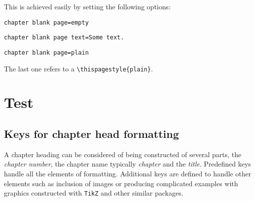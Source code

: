 \begin{teXXX}
\makeatletter
\def\cleardoublepage{\clearpage\if@twoside\ifodd\c@page\else
  \hbox{}
  \vspace*{\fill}
  \begin{center}
    This page left intentionally blank.
  \end{center}
  \vspace{\fill}
  \thispagestyle{empty}
  \newpage
  \if@twocolumn\hbox{}\newpage\fi\fi\fi}
\makeatother
\end{teXXX}


This is achieved easily by setting the following options:
\bigskip

\begin{tcolorbox}
\lstinline{chapter blank page=empty}\par
\lstinline{chapter blank page text=Some text.}\par
\lstinline{chapter blank page=plain}\par
\end{tcolorbox}
\medskip



The last one refers to a \lstinline!\thispagestyle{plain}!.
\chapter{Test}




\section*{Keys for chapter head formatting}

A chapter heading can be considered of being constructed of several parts, the \textit{chapter number}, the chapter name typically \textit{chapter} and the \textit{title}. Predefined keys handle all the elements of formatting. Additional keys are defined to handle other elements such as inclusion of images or producing complicated examples with graphics constructed with \texttt{TikZ} and other similar packages.


